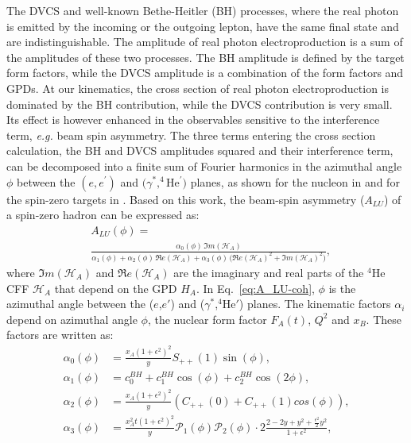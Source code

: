 \documentclass[twocolumn,nofootinbib,showpacs,prl,superscriptaddress,secnumarabic,amssymb,nobibnotes,aps,floatfix]{revtex4}
\begin{document}
The DVCS and well-known Bethe-Heitler (BH) processes, where the real 
photon is emitted by the incoming or the outgoing lepton, have the same final 
state and are indistinguishable. The amplitude of real photon 
electroproduction is a sum of the amplitudes of these two processes. The BH 
amplitude is defined by the target form factors, while the DVCS amplitude is 
a combination of the form factors and GPDs. At our kinematics, the cross 
section of real photon electroproduction is dominated by the BH 
contribution, while the DVCS contribution is very small. Its effect is however
enhanced in the observables sensitive to the interference term, {\it e.g.} 
beam spin asymmetry. The three terms entering the cross section calculation,
the BH and DVCS amplitudes squared and their interference term, 
can be decomposed into a finite sum of Fourier harmonics in the azimuthal angle
$\phi$ between the $(e,e^\prime)$ and $(\gamma^*,^4$He$^\prime)$ planes, as
shown for the nucleon in \cite{Belitsky:2001ns} and for the spin-zero targets
in \cite{Kirchner:2003wt,Belitsky:2008bz}. Based on this work, the beam-spin 
asymmetry ($A_{LU}$) of a spin-zero hadron can be expressed as:
\begin{equation}
\begin{split}
&A_{LU}(\phi) = \\
&\frac{\alpha_{0}(\phi) \, \Im m(\mathcal{H}_{A})}
{\alpha_{1}(\phi) + \alpha_{2}(\phi) \, \Re e(\mathcal{H}_{A}) + \alpha_{3}(\phi) \, 
\big( \Re e(\mathcal{H}_{A})^{2} + \Im m(\mathcal{H}_{A})^{2} \big)},
\end{split}
\label{eq:A_LU-coh}
\end{equation}
where $\Im m(\mathcal{H}_{A})$ and $\Re e(\mathcal{H}_{A})$ are the imaginary 
and real parts of the $^4$He CFF $\mathcal{H}_{A}$ that depend on the GPD 
$H_A$. In Eq.~\ref{eq:A_LU-coh}, $\phi$ is the azimuthal angle between the 
($e$,$e'$) and ($\gamma^{*}$,$^4$He$'$) planes. The kinematic factors 
$\alpha_i$
depend on azimuthal angle $\phi$, the nuclear form factor 
$F_A(t)$, $Q^2$ and $x_B$. These factors are written as:
\begin{align}
   \alpha_0 (\phi) & = \frac{x_{A}(1+\epsilon^2)^2}{y} S_{++}(1) \sin(\phi), \\
   \alpha_1 (\phi) & = c_0^{BH}+c_1^{BH} \cos({\phi})+c_2^{BH} \cos(2\phi), \\ 
   \alpha_2 (\phi) & = \frac{x_{A}(1+\epsilon^2)^2}{y}  \left( 
      C_{++}(0) +  C_{++}(1) cos(\phi) \right), \\
   \alpha_3 (\phi) &= \frac{x^{2}_{A}t(1+\epsilon^2)^2}{y} {\mathcal P}_1(\phi) 
      {\mathcal P}_2(\phi) \cdot 2 \frac{2-2y+y^2 + \frac{\epsilon^2}{2}y^2}{1 + 
      \epsilon^2},
\end{align}
\end{document}
